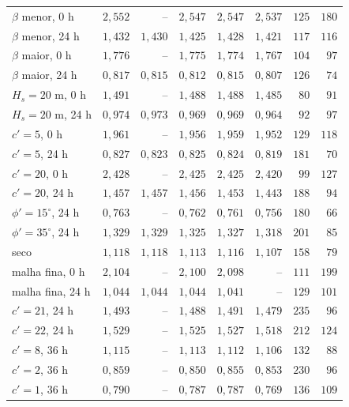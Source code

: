 \documentclass[11pt,a4paper]{article}
\numberwithin{equation}{section}
\begin{document}
{\begin{longtable}{lrrrrrrr}
$\beta$ menor, 0 h & $2{,}552$ & -- & $2{,}547$ & $2{,}547$ & $2{,}537$ & $125$ & $180$ \\
$\beta$ menor, 24 h & $1{,}432$ & $1{,}430$ & $1{,}425$ & $1{,}428$ & $1{,}421$ & $117$ & $116$ \\
$\beta$ maior, 0 h & $1{,}776$ & -- & $1{,}775$ & $1{,}774$ & $1{,}767$ & $104$ & $97$ \\
$\beta$ maior, 24 h & $0{,}817$ & $0{,}815$ & $0{,}812$ & $0{,}815$ & $0{,}807$ & $126$ & $74$ \\
$H_s = 20$ m, 0 h & $1{,}491$ & -- & $1{,}488$ & $1{,}488$ & $1{,}485$ & $80$ & $91$ \\
$H_s = 20$ m, 24 h & $0{,}974$ & $0{,}973$ & $0{,}969$ & $0{,}969$ & $0{,}964$ & $92$ & $97$ \\
$c' = 5$, 0 h & $1{,}961$ & -- & $1{,}956$ & $1{,}959$ & $1{,}952$ & $129$ & $118$ \\
$c' = 5$, 24 h & $0{,}827$ & $0{,}823$ & $0{,}825$ & $0{,}824$ & $0{,}819$ & $181$ & $70$ \\
$c' = 20$, 0 h & $2{,}428$ & -- & $2{,}425$ & $2{,}425$ & $2{,}420$ & $99$ & $127$ \\
$c' = 20$, 24 h & $1{,}457$ & $1{,}457$ & $1{,}456$ & $1{,}453$ & $1{,}443$ & $188$ & $94$ \\
$\phi' = 15^\circ$, 24 h & $0{,}763$ & -- & $0{,}762$ & $0{,}761$ & $0{,}756$ & $180$ & $66$ \\
$\phi' = 35^\circ$, 24 h & $1{,}329$ & $1{,}329$ & $1{,}325$ & $1{,}327$ & $1{,}318$ & $201$ & $85$ \\
seco & $1{,}118$ & $1{,}118$ & $1{,}113$ & $1{,}116$ & $1{,}107$ & $158$ & $79$ \\
malha fina, 0 h & $2{,}104$ & -- & $2{,}100$ & $2{,}098$ & -- & $111$ & $199$ \\
malha fina, 24 h & $1{,}044$ & $1{,}044$ & $1{,}044$ & $1{,}041$ & -- & $129$ & $101$ \\
$c' = 21$, 24 h & $1{,}493$ & -- & $1{,}488$ & $1{,}491$ & $1{,}479$ & $235$ & $96$ \\
$c' = 22$, 24 h & $1{,}529$ & -- & $1{,}525$ & $1{,}527$ & $1{,}518$ & $212$ & $124$ \\
$c' = 8$, 36 h & $1{,}115$ & -- & $1{,}113$ & $1{,}112$ & $1{,}106$ & $132$ & $88$ \\
$c' = 2$, 36 h & $0{,}859$ & -- & $0{,}850$ & $0{,}855$ & $0{,}853$ & $230$ & $96$ \\
$c' = 1$, 36 h & $0{,}790$ & -- & $0{,}787$ & $0{,}787$ & $0{,}769$ & $136$ & $109$ \\

\end{longtable}}
\end{document}

